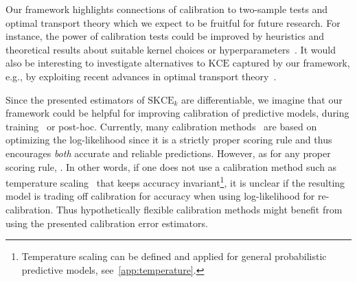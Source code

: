\documentclass{article}
\begin{document}
Our framework highlights connections of calibration to two-sample
tests and optimal transport theory which we expect
to be fruitful for future research. For instance, the power of calibration
tests could be improved by heuristics and theoretical results about
suitable kernel choices or hyperparameters~\citep[cf.][]{Jitkrittum2016}.
It would also be interesting to investigate alternatives to $\mathrm{KCE}$
captured by our framework, e.g., by exploiting recent advances in
optimal transport theory~\citep[cf.][]{Genevay2016}.

Since the presented estimators of $\mathrm{SKCE}_k$ are differentiable, we
imagine that our framework could be helpful for improving calibration of
predictive models, during training~\citep[cf.][]{Kumar2018} or post-hoc.
Currently, many calibration
methods~\citep[see, e.g.,][]{Guo2017,Kull2019,Song2019} are based on
optimizing the log-likelihood since it is a strictly proper scoring rule and
thus encourages \emph{both} accurate and reliable predictions. However, as
for any proper scoring rule, . In other words, if one does not
use a calibration method such as temperature scaling~\citep{Guo2017} that
keeps accuracy invariant\footnote{Temperature scaling can be defined
and applied for general probabilistic predictive models, see~\cref{app:temperature}.},
it is unclear if the resulting model is
trading off calibration for accuracy when using log-likelihood for
re-calibration. Thus hypothetically flexible calibration methods might
benefit from using the presented calibration error estimators.

%




\clearpage

\appendix
{}
\renewcommand*{\thetheorem}{\thesection.\arabic{theorem}}
\renewcommand*{\thelemma}{\thesection.\arabic{lemma}}
\renewcommand*{\theproposition}{\thesection.\arabic{proposition}}
\renewcommand*{\thecorollary}{\thesection.\arabic{corollary}}
\renewcommand*{\thedefinition}{\thesection.\arabic{definition}}
\renewcommand*{\theexample}{\thesection.\arabic{example}}
\renewcommand*{\theremark}{\thesection.\arabic{remark}}
\makeatletter
{}
\makeatother
\end{document}
